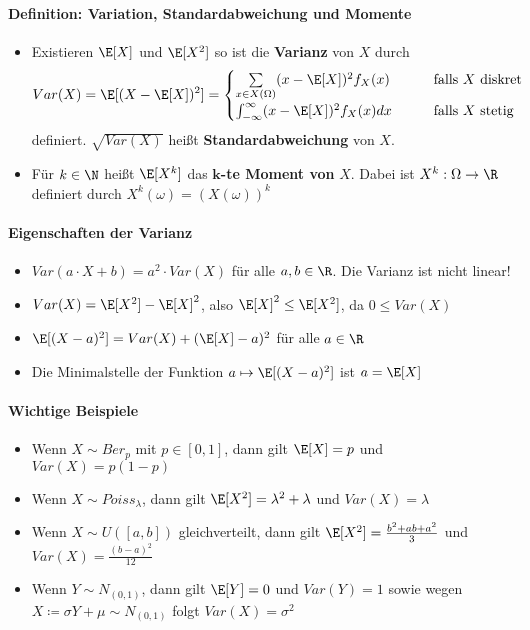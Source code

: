 \paragraph{Definition: Variation, Standardabweichung und Momente}
\begin{itemize}
	\item Existieren $\E[X]$ und $\E[X^2]$ so ist die \textbf{Varianz} von $X$ durch
	\[   
	Var(X)= \E[(X-\E[X])^2]=
	\begin{cases}
		\sum\limits_{x\in X(\Omega)}(x-\E[X])^2f_X(x) & \qquad\text{falls $X$ diskret}\\
		\int_{-\infty}^{\infty}(x-\E[X])^2f_X(x)dx & \qquad\text{falls $X$ stetig}
	\end{cases}
	\]
	definiert.
	$\sqrt{Var(X)}$ heißt \textbf{Standardabweichung} von $X$.
	\item Für $k\in\N$ heißt $\E[X^k]$ das $\boldsymbol{k}$\textbf{-te Moment von} $X$.
	Dabei ist $X^k:\Omega\rightarrow\R$ definiert durch $X^k(\omega)=(X(\omega))^k$
\end{itemize}

\newpage
\paragraph{Eigenschaften der Varianz}
\begin{itemize}
	\item $Var(a\cdot X+b)=a^2\cdot Var(X)$ für alle $a,b\in\R$. Die Varianz ist nicht linear!
	\item $Var(X)=\E[X^2]-\E[X]^2$, also $\E[X]^2\leq \E[X^2]$, da $0\leq Var(X)$
	\item $\E[(X-a)^2]=Var(X)+(\E[X]-a)^2$ für alle $a\in\R$
	\item Die Minimalstelle der Funktion $a\mapsto\E[(X-a)^2]$ ist $a=\E[X]$
\end{itemize}

\paragraph{Wichtige Beispiele}
\begin{itemize}
	\item Wenn $X\sim Ber_p$ mit $p\in [0,1]$, dann gilt $\E[X]=p$ und $Var(X)=p(1-p)$
	\item Wenn $X\sim Poiss_\lambda$, dann gilt $\E[X^2]=\lambda^2+\lambda$ und $Var(X)=\lambda$
	\item Wenn $X\sim U([a,b])$ gleichverteilt, dann gilt $\E[X^2]=\frac{b^2+ab+a^2}{3}$ und $Var(X)=\frac{(b-a)^2}{12}$
	\item Wenn $Y\sim N_{(0,1)}$, dann gilt $\E[Y]=0$ und $Var(Y)=1$ sowie wegen\\ $X\coloneqq\sigma Y+\mu\sim N_{(0,1)}$ folgt $Var(X)=\sigma^2$
\end{itemize}

